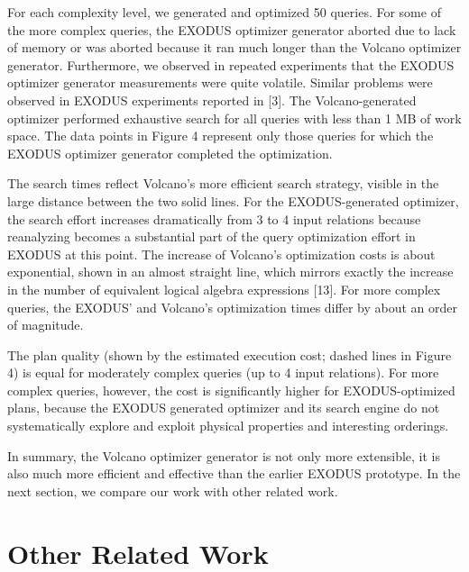 \documentclass[a4paper,12pt,notitlepage,twoside,openright]{article}
\begin{document}
For each complexity level, we generated and optimized 50 queries. For
some of the more complex queries, the EXODUS optimizer generator aborted
due to lack of memory or was aborted because it ran much longer than the
Volcano optimizer generator. Furthermore, we observed in repeated
experiments that the EXODUS optimizer generator measurements were quite
volatile. Similar problems were observed in EXODUS experiments reported
in {[}3{]}. The Volcano-generated optimizer performed exhaustive search
for all queries with less than 1 MB of work space. The data points in
Figure 4 represent only those queries for which the EXODUS optimizer
generator completed the optimization.

The search times reflect Volcano's more efficient search strategy,
visible in the large distance between the two solid lines. For the
EXODUS-generated optimizer, the search effort increases dramatically
from 3 to 4 input relations because reanalyzing becomes a substantial
part of the query optimization effort in EXODUS at this point. The
increase of Volcano's optimization costs is about exponential, shown in
an almost straight line, which mirrors exactly the increase in the
number of equivalent logical algebra expressions {[}13{]}. For more
complex queries, the EXODUS' and Volcano's optimization times differ by
about an order of magnitude.

The plan quality (shown by the estimated execution cost; dashed lines in
Figure 4) is equal for moderately complex queries (up to 4 input
relations). For more complex queries, however, the cost is significantly
higher for EXODUS-optimized plans, because the EXODUS generated
optimizer and its search engine do not systematically explore and
exploit physical properties and interesting orderings.

In summary, the Volcano optimizer generator is not only more extensible,
it is also much more efficient and effective than the earlier EXODUS
prototype. In the next section, we compare our work with other related
work.

\hypertarget{other-related-work}{%
\section{Other Related Work}\label{other-related-work}}
\end{document}

